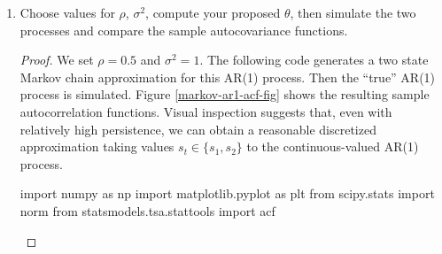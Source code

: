 \documentclass[oneside,reqno]{amsart}
\theoremstyle{definition}
\begin{document}
\begin{enumerate}[label=(\roman*)]
\begin{proof}
\[\begin{pmatrix}
	\end{pmatrix}.
\] 
The claim holds for the one-step ahead transition since
\[
	(1/2, 1/2)
	\begin{pmatrix}
		\frac{1+\rho}{2} & \frac{1- \rho}{2} \\
		\frac{1-\rho}{2} & \frac{1+ \rho}{2}
	\end{pmatrix}
	=\begin{pmatrix}
		\frac{1+\rho}{2} & \frac{1- \rho}{2} \\
		\frac{1-\rho}{2} & \frac{1+ \rho}{2}
	\end{pmatrix}.
\]
Assume the discrepancy measure is zero for $\tau$. Then for $\tau+1$,
\[
	(1/2, 1/2)
	\begin{pmatrix}
		\frac{1+\rho^\tau}{2} & \frac{1- \rho^\tau}{2} \\
		\frac{1-\rho^\tau}{2} & \frac{1+ \rho^\tau}{2}
	\end{pmatrix}
	=\begin{pmatrix}
		\frac{1+\rho^\tau}{2} & \frac{1- \rho^\tau}{2} \\
		\frac{1-\rho^\tau}{2} & \frac{1+ \rho^\tau}{2}
	\end{pmatrix}.
\]
Next, since by construction $E s_t = 0$, the autocovariance function of $s_t$ is 
\begin{align*}
	\gamma_s(\tau) &= E s_ts_{t+\tau} = E s_t E (s_{t+\tau} \mid s_t) \\
		&= \pi_1 s_1 E (s_{t+\tau} \mid s_t = s_1) +  (1-\pi_1) s_2 E (s_{t+\tau} \mid s_t = s_2) \\
		&= \frac{1}{2} s_1 \left(\frac{1+\rho^2}{2} s_1^2 + \frac{1-\rho^2}{2} s_2\right) + \frac{1}{2} s_2 \left(\frac{1+\rho^2}{2} s_1^2 + \frac{1-\rho^2}{2} s_2 \right) \\
		&= \frac{1}{2} \frac{1+\rho^2}{2} s_1^2 + \frac{1-\rho^2}{2} s_1s_2 + \frac{1}{2} \frac{1+\rho^2}{2} s_2 \\
		&= \frac{\sigma^2}{1-\rho^2}\rho^\tau = \gamma_y(\tau),
\end{align*}
the desired result.
\end{proof}
\item
Choose values for $\rho$, $\sigma^2$, compute your proposed $\theta$, then simulate the two processes and compare the sample autocovariance functions.
\begin{proof} 
We set $\rho = 0.5$ and $\sigma^2=1$. The following code generates a two state Markov chain approximation for this AR(1) process. Then the ``true'' AR(1) process is simulated. Figure \ref{markov-ar1-acf-fig} shows the resulting sample autocorrelation functions. Visual inspection suggests that, even with relatively high persistence, we can obtain a reasonable discretized approximation taking values $s_t \in \{s_1, s_2\}$ to the continuous-valued AR(1) process.
\begin{python3code}
import numpy as np
import matplotlib.pyplot as plt
from scipy.stats import norm
from statsmodels.tsa.stattools import acf


\end{python3code}
\end{proof}
\end{enumerate}
\end{document}
